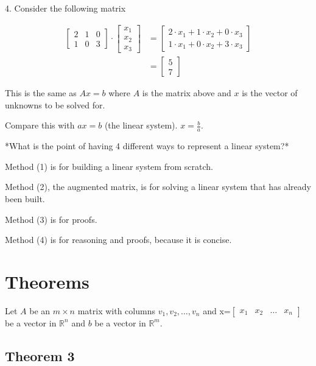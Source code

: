 \documentclass[12pt]{article}
\begin{document}
4. Consider the following matrix

\begin{align*}
  \begin{bmatrix}
    2 & 1 & 0 \\
    1 & 0 & 3
  \end{bmatrix}
  \cdot
  \begin{bmatrix}
    x_1 \\ x_2 \\ x_3
  \end{bmatrix}
  &=
  \begin{bmatrix}
    2 \cdot x_1 + 1 \cdot x_2 + 0 \cdot x_3 \\
    1 \cdot x_1 + 0 \cdot x_2 + 3 \cdot x_3
  \end{bmatrix}\\
  &=
  \begin{bmatrix}
    5 \\ 7
  \end{bmatrix}
\end{align*}

This is the same as $Ax=b$ where $A$ is the matrix above and $x$ is the vector
of unknowns to be solved for.

Compare this with $ax=b$ (the linear system). $x=\frac{b}{a}$.

*What is the point of having 4 different ways to represent a linear system?*

Method (1) is for building a linear system from scratch.

Method (2), the augmented matrix, is for solving a linear system that has already
been built.

Method (3) is for proofs.

Method (4) is for reasoning and proofs, because it is concise.


\section{Theorems}

Let $A$ be an $m \times n$ matrix with columns $v_{1}, v_{2}, \dots, v_{n}$ and
x=$\begin{bmatrix} x_{1} & x_{2} & \dots & x_{n} \end{bmatrix}$ be a vector in
$\mathbb{R}^{n}$ and $b$ be a vector in $\mathbb{R}^{m}$.

\subsection{Theorem 3}
\end{document}
